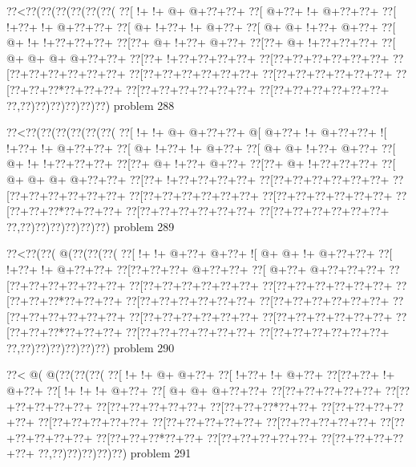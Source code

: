 \vbox{\vbox{\goo
\0??<\0??(\0??(\0??(\0??(\0??(\0??(
\0??[\- !+\- !+\- @+\- @+\0??+\0??+
\0??[\- @+\0??+\- !+\- @+\0??+\0??+
\0??[\- !+\0??+\- !+\- @+\0??+\0??+
\0??[\- @+\- !+\0??+\- !+\- @+\0??+
\0??[\- @+\- @+\- !+\0??+\- @+\0??+
\0??[\- @+\- !+\- !+\0??+\0??+\0??+
\0??[\0??+\- @+\- !+\0??+\- @+\0??+
\0??[\0??+\- @+\- !+\0??+\0??+\0??+
\0??[\- @+\- @+\- @+\- @+\0??+\0??+
\0??[\0??+\- !+\0??+\0??+\0??+\0??+
\0??[\0??+\0??+\0??+\0??+\0??+\0??+
\0??[\0??+\0??+\0??+\0??+\0??+\0??+
\0??[\0??+\0??+\0??+\0??+\0??+\0??+
\0??[\0??+\0??+\0??+\0??+\0??+\0??+
\0??[\0??+\0??+\0??*\0??+\0??+\0??+
\0??[\0??+\0??+\0??+\0??+\0??+\0??+
\0??[\0??+\0??+\0??+\0??+\0??+\0??+
\0??,\0??)\0??)\0??)\0??)\0??)\0??)
}
\hfil problem 288\hfil\break
}

\vbox{\vbox{\goo
\0??<\0??(\0??(\0??(\0??(\0??(\0??(
\0??[\- !+\- !+\- @+\- @+\0??+\0??+
\- @[\- @+\0??+\- !+\- @+\0??+\0??+
\- ![\- !+\0??+\- !+\- @+\0??+\0??+
\0??[\- @+\- !+\0??+\- !+\- @+\0??+
\0??[\- @+\- @+\- !+\0??+\- @+\0??+
\0??[\- @+\- !+\- !+\0??+\0??+\0??+
\0??[\0??+\- @+\- !+\0??+\- @+\0??+
\0??[\0??+\- @+\- !+\0??+\0??+\0??+
\0??[\- @+\- @+\- @+\- @+\0??+\0??+
\0??[\0??+\- !+\0??+\0??+\0??+\0??+
\0??[\0??+\0??+\0??+\0??+\0??+\0??+
\0??[\0??+\0??+\0??+\0??+\0??+\0??+
\0??[\0??+\0??+\0??+\0??+\0??+\0??+
\0??[\0??+\0??+\0??+\0??+\0??+\0??+
\0??[\0??+\0??+\0??*\0??+\0??+\0??+
\0??[\0??+\0??+\0??+\0??+\0??+\0??+
\0??[\0??+\0??+\0??+\0??+\0??+\0??+
\0??,\0??)\0??)\0??)\0??)\0??)\0??)
}
\hfil problem 289\hfil\break
}

\vbox{\vbox{\goo
\0??<\0??(\0??(\- @(\0??(\0??(\0??(
\0??[\- !+\- !+\- @+\0??+\- @+\0??+
\- ![\- @+\- @+\- !+\- @+\0??+\0??+
\0??[\- !+\0??+\- !+\- @+\0??+\0??+
\0??[\0??+\0??+\0??+\- @+\0??+\0??+
\0??[\- @+\0??+\- @+\0??+\0??+\0??+
\0??[\0??+\0??+\0??+\0??+\0??+\0??+
\0??[\0??+\0??+\0??+\0??+\0??+\0??+
\0??[\0??+\0??+\0??+\0??+\0??+\0??+
\0??[\0??+\0??+\0??*\0??+\0??+\0??+
\0??[\0??+\0??+\0??+\0??+\0??+\0??+
\0??[\0??+\0??+\0??+\0??+\0??+\0??+
\0??[\0??+\0??+\0??+\0??+\0??+\0??+
\0??[\0??+\0??+\0??+\0??+\0??+\0??+
\0??[\0??+\0??+\0??+\0??+\0??+\0??+
\0??[\0??+\0??+\0??*\0??+\0??+\0??+
\0??[\0??+\0??+\0??+\0??+\0??+\0??+
\0??[\0??+\0??+\0??+\0??+\0??+\0??+
\0??,\0??)\0??)\0??)\0??)\0??)\0??)
}
\hfil problem 290\hfil\break
}

\vbox{\vbox{\goo
\0??<\- @(\- @(\0??(\0??(\0??(
\0??[\- !+\- !+\- @+\- @+\0??+
\0??[\- !+\0??+\- !+\- @+\0??+
\0??[\0??+\0??+\- !+\- @+\0??+
\0??[\- !+\- !+\- !+\- @+\0??+
\0??[\- @+\- @+\- @+\0??+\0??+
\0??[\0??+\0??+\0??+\0??+\0??+
\0??[\0??+\0??+\0??+\0??+\0??+
\0??[\0??+\0??+\0??+\0??+\0??+
\0??[\0??+\0??+\0??*\0??+\0??+
\0??[\0??+\0??+\0??+\0??+\0??+
\0??[\0??+\0??+\0??+\0??+\0??+
\0??[\0??+\0??+\0??+\0??+\0??+
\0??[\0??+\0??+\0??+\0??+\0??+
\0??[\0??+\0??+\0??+\0??+\0??+
\0??[\0??+\0??+\0??*\0??+\0??+
\0??[\0??+\0??+\0??+\0??+\0??+
\0??[\0??+\0??+\0??+\0??+\0??+
\0??,\0??)\0??)\0??)\0??)\0??)
}
\hfil problem 291\hfil\break
}

